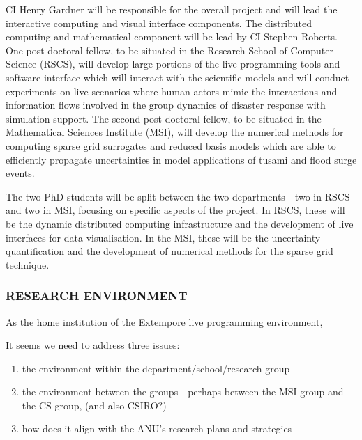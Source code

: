 \documentclass[a4paper,fontsize=12pt]{scrartcl}
\begin{document}
CI Henry Gardner will be responsible for the overall project and will lead the
interactive computing and visual interface components. The distributed computing
and mathematical component will be lead by CI Stephen Roberts. One post-doctoral
fellow, to be situated in the Research School of Computer Science
(RSCS), will develop large portions of the live programming tools and
software interface which will interact with the scientific models and will conduct experiments on live scenarios where human actors mimic the interactions and information flows involved in the group dynamics of disaster response with simulation support. The
second post-doctoral fellow, to be situated in the Mathematical
Sciences Institute (MSI), will develop the numerical methods for
computing sparse grid surrogates and reduced basis models which are
able to efficiently propagate uncertainties in model applications of tusami and flood surge events. 

The two  PhD students will be split between the two departments---two
in RSCS and two in MSI, focusing on specific aspects of the project.
In RSCS, these will be the dynamic distributed computing
infrastructure and the development of live interfaces for data
visualisation. In the MSI, these will be the uncertainty
quantification and the development of numerical methods for the sparse
grid technique.

\subsubsection*{RESEARCH ENVIRONMENT}

As the home institution of the Extempore live programming environment, 


It seems we need to address three issues: 

\begin{enumerate}
\item the environment within the department/school/research group
\item the environment between the groups---perhaps between the MSI
  group and the CS group, (and also CSIRO?)
\item how does it align with the ANU's research plans and strategies
\end{enumerate}
\end{document}
